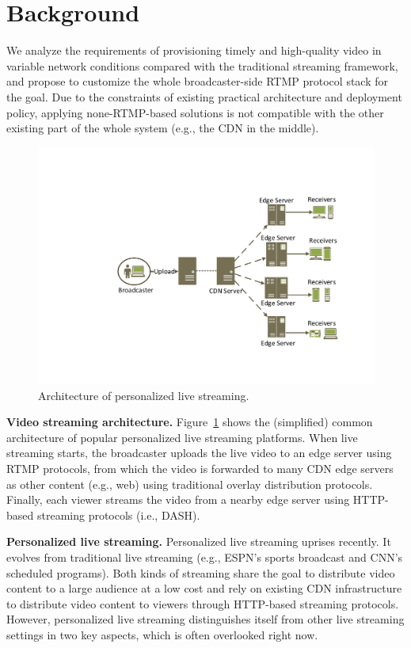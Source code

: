 \section{Background}
We analyze the requirements of provisioning timely and high-quality video in variable network conditions compared with the traditional streaming framework, and propose to customize the whole broadcaster-side RTMP protocol stack for the goal. Due to the constraints of existing practical architecture and deployment policy, applying none-RTMP-based solutions is not compatible with the other existing part of the whole system (e.g., the CDN in the middle).

\begin{figure}[t]
\centerline{\includegraphics[width=0.9\columnwidth]{fig/architecture.pdf}}
\vspace{-0.08in}
\caption{Architecture of personalized live streaming.}
\vspace{-0.1in}
\label{fig:architecture}
\end{figure}
\textbf{Video streaming architecture.}
Figure~\ref{fig:architecture} shows the (simplified) common architecture
of popular personalized live streaming platforms. When live streaming
starts, the broadcaster uploads the live video to an edge server using
RTMP protocols, from which the video is forwarded to many CDN edge servers
as other content (e.g., web) using traditional overlay distribution
protocols. Finally, each viewer streams the video from a nearby edge
server using HTTP-based streaming protocols (i.e., DASH).

\textbf{Personalized live streaming.}
Personalized live streaming uprises recently. It evolves from traditional live streaming (e.g., ESPN's sports broadcast
and CNN's scheduled programs). Both kinds of streaming share the goal to distribute video content to a large audience at a low cost and  rely on existing CDN infrastructure to distribute video content to viewers through HTTP-based streaming protocols. However, personalized live streaming distinguishes itself from
other live streaming settings in two key aspects, which is often overlooked right now.

